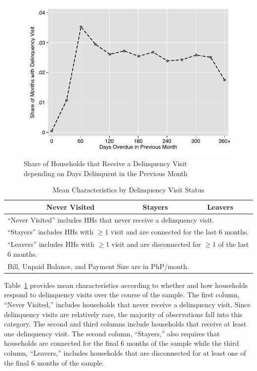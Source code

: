 \documentclass[12pt]{article}
\begin{document}
\begin{figure}
\centering
\caption{Share of Households that Receive a Delinquency Visit \\ depending on Days Delinquent in the Previous Month}\label{figure:dc_hazard}
\includegraphics[scale=.7]{tables/connected_visit_hazard_all.pdf}
\end{figure}



\begin{table}[h!]
\centering
\caption{Mean Characteristics by Delinquency Visit Status}\label{table:descriptives_3g}
\vspace{-2mm}
\begin{tabular}{l*{1}{ccc}}
\toprule
 & Never Visited & Stayers & Leavers  \\
\midrule

\bottomrule
\multicolumn{4}{l}{\scriptsize ``Never Visited'' includes HHs that never receive a delinquency visit.}\\  [-.5em]
\multicolumn{4}{l}{\scriptsize ``Stayers'' includes HHs with $\geq$1 visit and are connected for the last 6 months.}\\ [-.5em]
\multicolumn{4}{l}{\scriptsize ``Leavers'' includes HHs with $\geq$1 visit and are disconnected for $\geq$1 of the last 6 months.}\\ [-.5em]
\multicolumn{4}{l}{\scriptsize Bill, Unpaid Balance, and Payment Size are in PhP/month.} 
\end{tabular}
\end{table}


Table~\ref{table:descriptives_3g} provides mean characteristics according to whether and how households respond to delinquency visits over the course of the sample.  The first column, ``Never Visited,'' includes households that never receive a delinquency visit.  Since delinquency visits are relatively rare, the majority of observations fall into this category.  The second and third columns include households that receive at least one delinquency visit.   The second column, ``Stayers,'' also requires that households are connected for the final 6 months of the sample while the third column, ``Leavers,'' includes households that are disconnected for at least one of the final 6 months of the sample.  
\end{document}
